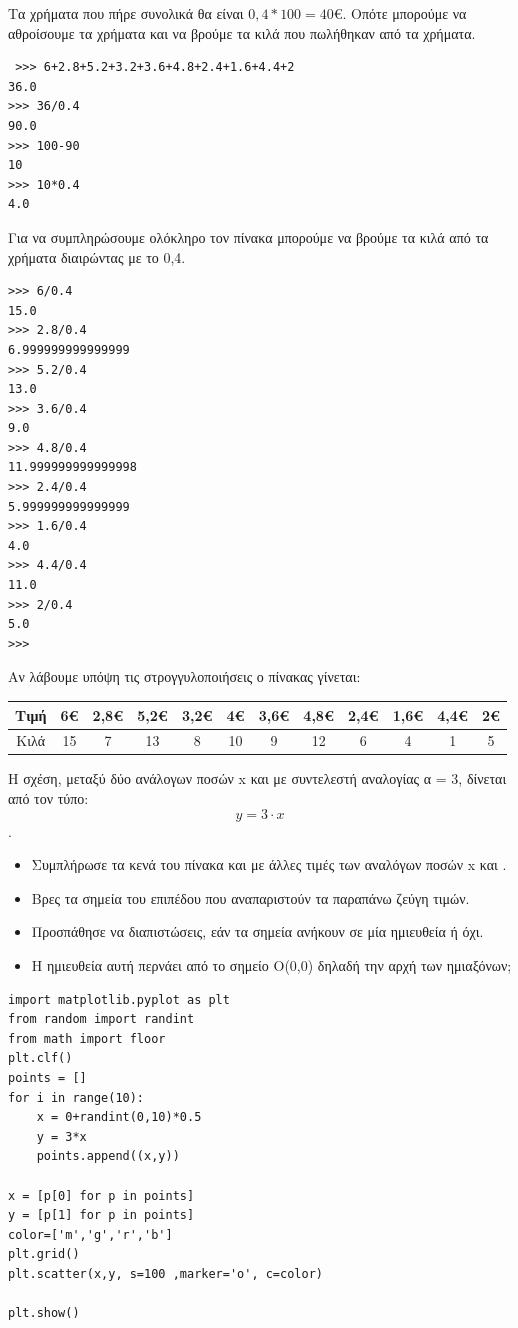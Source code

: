  Τα χρήματα που πήρε συνολικά θα είναι $0,4*100=40$€. Οπότε μπορούμε να αθροίσουμε τα χρήματα και να βρούμε τα κιλά που πωλήθηκαν από τα χρήματα.
 \begin{lstlisting}
 >>> 6+2.8+5.2+3.2+3.6+4.8+2.4+1.6+4.4+2
36.0
>>> 36/0.4
90.0
>>> 100-90
10
>>> 10*0.4
4.0
\end{lstlisting}
Για να συμπληρώσουμε ολόκληρο τον πίνακα μπορούμε να βρούμε τα κιλά από τα χρήματα διαιρώντας με το 0,4.
\begin{lstlisting}
>>> 6/0.4
15.0
>>> 2.8/0.4
6.999999999999999
>>> 5.2/0.4
13.0
>>> 3.6/0.4
9.0
>>> 4.8/0.4
11.999999999999998
>>> 2.4/0.4
5.999999999999999
>>> 1.6/0.4
4.0
>>> 4.4/0.4
11.0
>>> 2/0.4
5.0
>>>
\end{lstlisting}
Αν λάβουμε υπόψη τις στρογγυλοποιήσεις ο πίνακας γίνεται:
\begin{table}
\begin{tabular}{|c|c|c|c|c|c|c|c|c|c|c|c|}
\hline
Tιμή& 6€ & 2,8€ & 5,2€ & 3,2€ & 4€ & 3,6€ & 4,8€ & 2,4€ & 1,6€ & 4,4€ & 2€\\\hline
Κιλά&  15 &  7    &   13    &   8      & 10& 9      &  12    &   6     &  4    &   1       &  5   \\\hline
\end{tabular}
\end{table}    
\begin{exercise}
Η	σχέση,	μεταξύ	δύο	ανάλογων	ποσών	x	και		με	συντελεστή	αναλογίας	α	=	3,	δίνεται	από	τον	τύπο:		
$$ y =	3 \cdot x$$.
\begin{itemize}
\item Συμπλήρωσε	τα	κενά	του	πίνακα	και	με	άλλες	τιμές	των	αναλόγων	ποσών	x	και	.
\item Βρες	τα	σημεία	του	επιπέδου	που		αναπαριστούν	τα	παραπάνω		ζεύγη	τιμών.
\item Προσπάθησε	να	διαπιστώσεις,	εάν		τα	σημεία	ανήκουν	σε	μία	ημιευθεία		ή	όχι.	
\item Η	ημιευθεία	αυτή	περνάει	από		το	σημείο	Ο(0,0)	δηλαδή	την	αρχή		των	ημιαξόνων;
\end{itemize}
\end{exercise}
\begin{lstlisting}
import matplotlib.pyplot as plt
from random import randint
from math import floor
plt.clf()
points = []
for i in range(10):
    x = 0+randint(0,10)*0.5
    y = 3*x
    points.append((x,y))

x = [p[0] for p in points]
y = [p[1] for p in points]
color=['m','g','r','b']
plt.grid()
plt.scatter(x,y, s=100 ,marker='o', c=color)

plt.show()
\end{lstlisting}
